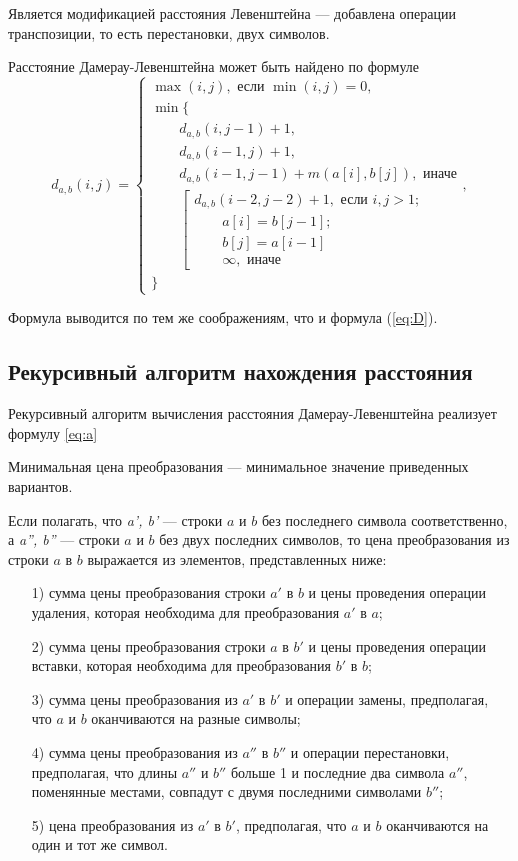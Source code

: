 Является модификацией расстояния Левенштейна --- добавлена операции транспозиции, то есть перестановки, двух символов.

Расстояние Дамерау-Левенштейна может быть найдено по формуле
\newpage
\begin{equation}
	\label{eq:a}
	d_{a,b}(i, j) = \begin{cases}
		\max(i, j), \text{ если }\min(i, j) = 0,\\
		\min \lbrace \\
		\qquad d_{a,b}(i, j-1) + 1,\\
		\qquad d_{a,b}(i-1, j) + 1,\\
		\qquad d_{a,b}(i-1, j-1) + m(a[i], b[j]), \text{ иначе}\\
		\qquad \left[ \begin{array}{cc}d_{a,b}(i-2, j-2) + 1, \text{ если }i,j > 1;\\
			\qquad \text{}a[i] = b[j-1]; \\
			\qquad \text{}b[j] = a[i-1]\\
			\qquad \infty, \text{ иначе}\end{array}\right.\\
		\rbrace
	\end{cases},
\end{equation}

Формула выводится по тем же соображениям, что и формула (\ref{eq:D}).

\subsection{Рекурсивный алгоритм нахождения расстояния}
Рекурсивный алгоритм вычисления расстояния Дамерау-Левенштейна реализует формулу \ref{eq:a}

Минимальная цена преобразования --- минимальное значение приведенных вариантов.

Если полагать, что \textit{a', b'} --- строки $a$ и $b$ без последнего символа соответственно, а \textit{a'', b''} --- строки $a$ и $b$ без двух последних символов, то цена преобразования из строки $a$ в $b$ выражается из элементов, представленных ниже:
\begin{enumerate}
	\item[1)] сумма цены преобразования строки $a'$ в $b$ и цены проведения операции удаления, которая необходима для преобразования $a'$ в $a$;
	\item[2)] сумма цены преобразования строки $a$ в $b'$  и цены проведения операции вставки, которая необходима для преобразования $b'$ в $b$;	
	\newpage
	\item[3)] сумма цены преобразования из $a'$ в $b'$ и операции замены, предполагая, что $a$ и $b$ оканчиваются на разные символы;
	\item[4)] сумма цены преобразования из $a''$ в $b''$ и операции перестановки, предполагая, что длины $a''$ и $b''$ больше 1 и последние два символа $a''$, поменянные местами, совпадут с двумя последними символами $b''$;
	\item[5)] цена преобразования из $a'$ в $b'$, предполагая, что $a$ и $b$ оканчиваются на один и тот же символ.
\end{enumerate}

